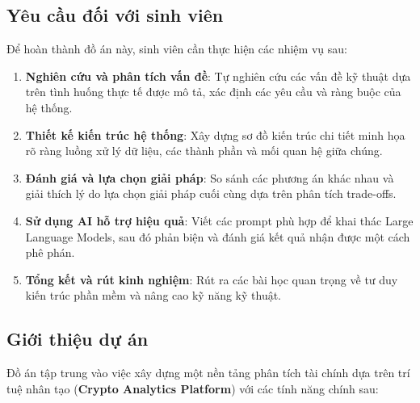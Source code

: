\subsection*{Yêu cầu đối với sinh viên}

Để hoàn thành đồ án này, sinh viên cần thực hiện các nhiệm vụ sau:

\begin{enumerate}
    \item \textbf{Nghiên cứu và phân tích vấn đề}: Tự nghiên cứu các vấn đề kỹ thuật dựa trên tình huống thực tế được mô tả, xác định các yêu cầu và ràng buộc của hệ thống.
    
    \item \textbf{Thiết kế kiến trúc hệ thống}: Xây dựng sơ đồ kiến trúc chi tiết minh họa rõ ràng luồng xử lý dữ liệu, các thành phần và mối quan hệ giữa chúng.
    
    \item \textbf{Đánh giá và lựa chọn giải pháp}: So sánh các phương án khác nhau và giải thích lý do lựa chọn giải pháp cuối cùng dựa trên phân tích trade-offs.
    
    \item \textbf{Sử dụng AI hỗ trợ hiệu quả}: Viết các prompt phù hợp để khai thác Large Language Models, sau đó phản biện và đánh giá kết quả nhận được một cách phê phán.
    
    \item \textbf{Tổng kết và rút kinh nghiệm}: Rút ra các bài học quan trọng về tư duy kiến trúc phần mềm và nâng cao kỹ năng kỹ thuật.
\end{enumerate}

\subsection*{Giới thiệu dự án}

Đồ án tập trung vào việc xây dựng một nền tảng phân tích tài chính dựa trên trí tuệ nhân tạo (\textbf{Crypto Analytics Platform}) với các tính năng chính sau:

